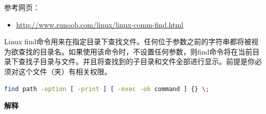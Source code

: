 \documentclass[doctor,openright,twoside]{sjtuthesis}
\providecommand{\tightlist}{%
    \setlength{\itemsep}{0pt}\setlength{\parskip}{0pt}}
\theoremstyle{plain}
\theoremstyle{definition}
\theoremstyle{remark}
\theoremstyle{ocrenumbox}
\theoremstyle{plain}
\begin{document}
参考网页：

\begin{itemize}
\tightlist
\item
  \url{http://www.runoob.com/linux/linux-comm-find.html}
\end{itemize}

Linux find命令用来在指定目录下查找文件。任何位于参数之前的字符串都将被视为欲查找的目录名。如果使用该命令时，不设置任何参数，则find命令将在当前目录下查找子目录与文件。并且将查找到的子目录和文件全部进行显示。前提是你必须对这个文件（夹）有相关权限。

\begin{lstlisting}[language=bash]
find path -option [ -print ] [ -exec -ok command ] {} \;
\end{lstlisting}

\textbf{解释}
\end{document}
